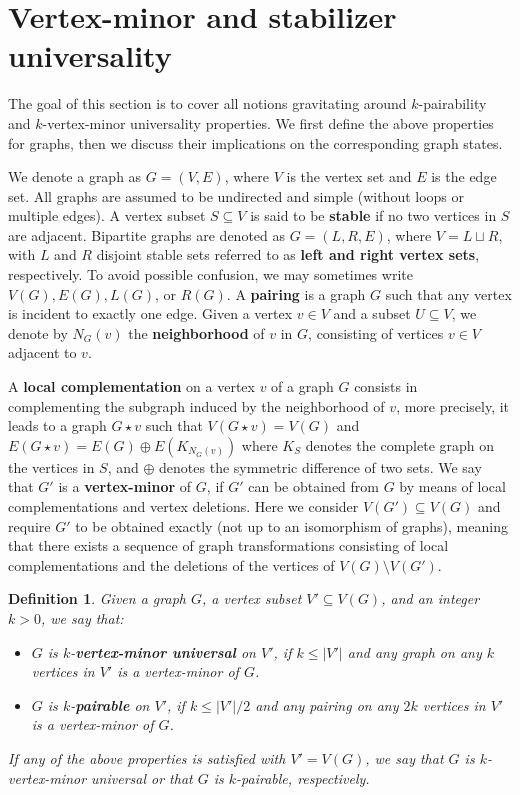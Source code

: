 \documentclass[10pt,a4paper]{article}
\newtheorem{definition}{Definition}[section]
\newcommand{\ls}{\leqslant}
\begin{document}
\section{Vertex-minor and stabilizer universality}

The goal of this section is to cover all notions gravitating around  $k$-pairability and $k$-vertex-minor universality properties. We  first define the above properties for graphs,  then we  discuss their implications on the corresponding graph states. 

We denote a graph as $G = (V,E)$, where $V$ is the vertex set and $E$ is the edge set. All graphs are assumed to be undirected and simple (without loops or multiple edges). A vertex subset $S\subseteq V$ is said to be \textbf{stable} if no two vertices in $S$ are adjacent. Bipartite graphs are denoted as $G=(L, R, E)$, where $V = L \sqcup R$, with $L$ and $R$ disjoint stable sets referred to as \textbf{left and right vertex sets}, respectively.  To avoid possible confusion, we may sometimes write $V(G), E(G), L(G)$, or $R(G)$. A \textbf{pairing} is a graph $G$ such that any vertex is incident to exactly one edge. Given a vertex $v\in V$ and a subset $U\subseteq V$, we denote by $N_G(v)$ the \textbf{neighborhood} of $v$ in $G$, consisting of vertices $v\in V$ adjacent to $v$.

A \textbf{local complementation} on a vertex $v$ of a graph $G$ consists in complementing the subgraph induced by the neighborhood of $v$, more precisely, it leads to a graph $G\star v$ such that $V(G\star v)=V(G)$ and $E(G\star v) = E(G)\oplus E(K_{N_G(v)})$ where $K_S$ denotes the complete graph on the vertices in $S$, and $\oplus$ denotes the symmetric difference of two sets. We say that $G'$ is a \textbf{vertex-minor} of $G$, if $G'$ can be obtained from $G$ by means of local complementations and vertex deletions.  Here we consider $V(G') \subseteq V(G)$ and require $G'$ to be obtained exactly (not up to an isomorphism of graphs), meaning that there exists a sequence of graph transformations consisting of local complementations and the deletions of the vertices of $V(G)\setminus V(G')$.

\begin{definition} \label{def:kvmu-kpair}
    Given a graph $G$, a vertex subset  $V' \subseteq V(G)$, and an integer $k > 0$, we say that:
    \begin{itemize}
        \item $G$  is $k$-\textbf{vertex-minor universal} on $V'$, if $k\ls |V'|$ and any  graph on any $k$ vertices in $V'$ is a vertex-minor of $G$. 
        \item $G$ is $k$-\textbf{pairable} on $V'$, if $k\ls |V'|/2$ and any pairing on any $2k$ vertices in $V'$ is a vertex-minor of $G$.
    \end{itemize}


    If any of the above properties is satisfied with $V' = V(G)$, we say that $G$ is $k$-\emph{vertex-minor universal} or that $G$ is $k$-\emph{pairable}, respectively.
\end{definition}
\end{document}

